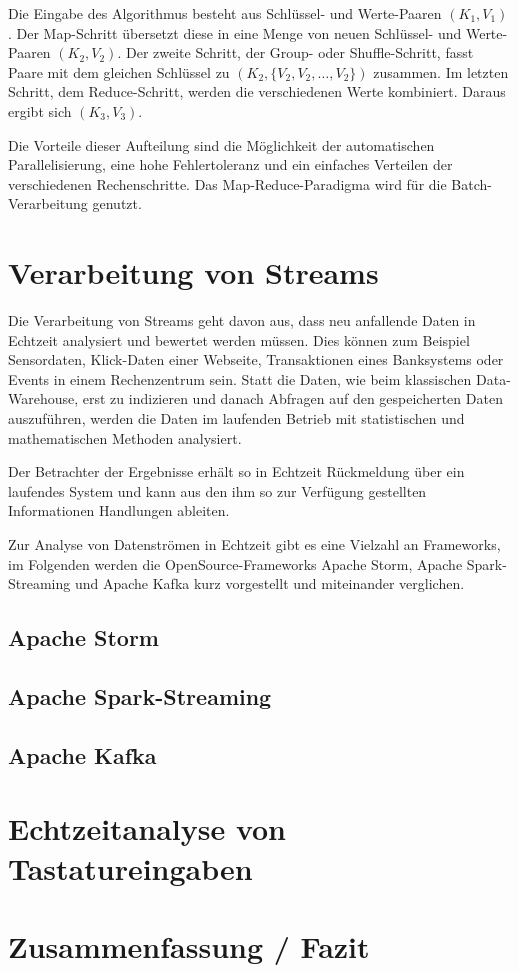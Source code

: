 \documentclass[a4paper,11pt]{scrartcl}
\begin{document}
Die Eingabe des Algorithmus besteht aus Schlüssel- und Werte-Paaren
$(K_1,V_1)$. Der Map-Schritt übersetzt diese in eine Menge von neuen Schlüssel-
und Werte-Paaren $(K_2,V_2)$. Der zweite Schritt, der Group- oder
Shuffle-Schritt, fasst Paare mit dem gleichen Schlüssel zu $(K_2,
\{V_2,V_2,\ldots,V_2\})$ zusammen. Im letzten Schritt, dem Reduce-Schritt,
werden die verschiedenen Werte kombiniert. Daraus ergibt sich $(K_3,V_3)$.

Die Vorteile dieser Aufteilung sind die Möglichkeit der automatischen
Parallelisierung, eine hohe Fehlertoleranz und ein einfaches Verteilen der
verschiedenen Rechenschritte. Das Map-Reduce-Paradigma wird für die
Batch-Verarbeitung genutzt.

\section{Verarbeitung von Streams}
Die Verarbeitung von Streams geht davon aus, dass neu anfallende Daten in
Echtzeit analysiert und bewertet werden müssen. Dies können zum Beispiel
Sensordaten, Klick-Daten einer Webseite, Transaktionen eines Banksystems oder
Events in einem Rechenzentrum sein. Statt die Daten, wie beim klassischen
Data-Warehouse, erst zu indizieren und danach Abfragen auf den gespeicherten
Daten auszuführen, werden die Daten im laufenden Betrieb mit statistischen und
mathematischen Methoden analysiert.

Der Betrachter der Ergebnisse erhält so in Echtzeit Rückmeldung über ein
laufendes System und kann aus den ihm so zur Verfügung gestellten Informationen
Handlungen ableiten.


Zur Analyse von Datenströmen in Echtzeit gibt es eine Vielzahl an Frameworks,
im Folgenden werden die OpenSource-Frameworks Apache Storm, Apache
Spark-Streaming und Apache Kafka kurz vorgestellt und miteinander verglichen.



\subsection{Apache Storm}
\subsection{Apache Spark-Streaming}
\subsection{Apache Kafka}

\section{Echtzeitanalyse von Tastatureingaben}


\section{Zusammenfassung / Fazit}
\end{document}
